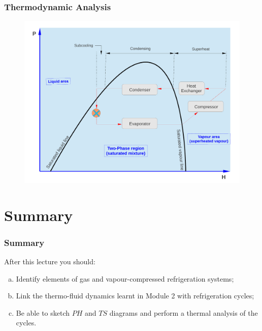 \documentclass[10pt,compress]{beamer}
\begin{document}
\begin{frame}
 \frametitle{Thermodynamic Analysis} 
   \begin{figure}%
     \includegraphics[width=.8\columnwidth]{./Pics/Overview_Refrig19}
   \end{figure}
\end{frame}


\section{Summary}

\begin{frame}
 \frametitle{Summary}
  After this lecture you should:
 \begin{enumerate}[(a)]
  \item <1-> Identify elements of gas and vapour-compressed refrigeration systems;
  \item <2-> Link the thermo-fluid dynamics learnt in Module 2 with refrigeration cycles;
  \item <3-> Be able to sketch $PH$ and $TS$ diagrams and perform a thermal analysis of the cycles.
 \end{enumerate}
\end{frame}
\end{document}

